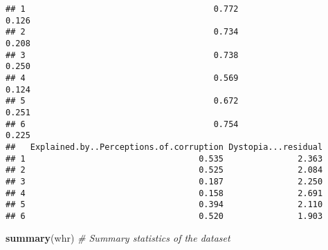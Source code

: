 \documentclass[
]{article}
\newenvironment{Shaded}{\begin{snugshade}}{\end{snugshade}}
\newcommand{\CommentTok}[1]{\textcolor[rgb]{0.56,0.35,0.01}{\textit{#1}}}
\newcommand{\FunctionTok}[1]{\textcolor[rgb]{0.13,0.29,0.53}{\textbf{#1}}}
\newcommand{\NormalTok}[1]{#1}
\begin{document}
\begin{verbatim}
## 1                                      0.772                    0.126
## 2                                      0.734                    0.208
## 3                                      0.738                    0.250
## 4                                      0.569                    0.124
## 5                                      0.672                    0.251
## 6                                      0.754                    0.225
##   Explained.by..Perceptions.of.corruption Dystopia...residual
## 1                                   0.535               2.363
## 2                                   0.525               2.084
## 3                                   0.187               2.250
## 4                                   0.158               2.691
## 5                                   0.394               2.110
## 6                                   0.520               1.903
\end{verbatim}

\begin{Shaded}
\begin{Highlighting}[]
\FunctionTok{summary}\NormalTok{(whr)  }\CommentTok{\# Summary statistics of the dataset}
\end{Highlighting}
\end{Shaded}
\end{document}
